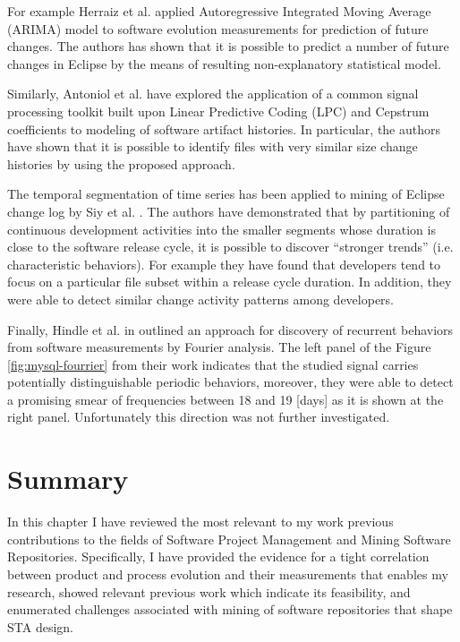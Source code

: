 For example Herraiz et al. \cite{citeulike:6544685} applied Autoregressive Integrated Moving Average (ARIMA) model 
to software evolution measurements for prediction of future changes. The authors has shown that it is possible to 
predict a number of future changes in Eclipse by the means of resulting non-explanatory statistical model. 

Similarly, Antoniol et al. \cite{citeulike:3378725} have explored the application of a common signal processing toolkit 
built upon Linear Predictive Coding (LPC) and Cepstrum coefficients to modeling of software artifact histories. 
In particular, the authors have shown that it is possible to identify files with very similar size change histories 
by using the proposed approach.

The temporal segmentation of time series has been applied to mining of Eclipse change log by Siy et al. \cite{citeulike:10896305}.
The authors have demonstrated that by partitioning of continuous development activities into the smaller segments whose duration 
is close to the software release cycle, it is possible to discover ``stronger trends'' (i.e. characteristic behaviors). 
For example they have found that developers tend to focus on a particular file subset within a release cycle duration. 
In addition, they were able to detect similar change activity patterns among developers.

Finally, Hindle et al. in \cite{citeulike:10377345} outlined an approach for discovery of recurrent behaviors from software 
measurements by Fourier analysis. 
The left panel of the Figure \ref{fig:mysql-fourrier} from their work indicates that the studied signal carries potentially 
distinguishable periodic behaviors, moreover, they were able to detect a promising smear of frequencies between 18 and 19 
[days] as it is shown at the right panel. Unfortunately this direction was not further investigated.

\section{Summary}
In this chapter I have reviewed the most relevant to my work previous contributions to the fields of Software Project Management 
and Mining Software Repositories. Specifically, I have provided the evidence for a tight correlation between product and process evolution 
and their measurements that enables my research, showed relevant previous work which indicate its feasibility,
and enumerated challenges associated with mining of software repositories that shape STA design. 

